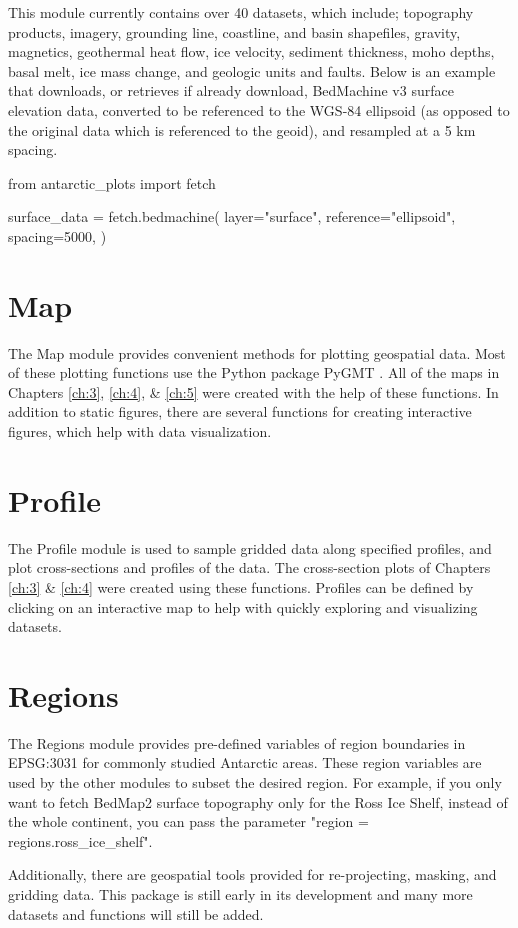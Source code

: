 This module currently contains over 40 datasets, which include; topography products, imagery, grounding line, coastline, and basin shapefiles, gravity, magnetics, geothermal heat flow, ice velocity, sediment thickness, moho depths, basal melt, ice mass change, and geologic units and faults. Below is an example that downloads, or retrieves if already download, BedMachine v3 surface elevation data, converted to be referenced to the WGS-84 ellipsoid (as opposed to the original data which is referenced to the geoid), and resampled at a 5 km spacing.
\begin{python}
from antarctic_plots import fetch

surface_data = fetch.bedmachine(
    layer="surface", 
    reference="ellipsoid", 
    spacing=5000,
)
\end{python}

\section{Map}

The Map module provides convenient methods for plotting geospatial data. Most of these plotting functions use the Python package PyGMT \citep{uiedapygmt2021}. All of the maps in Chapters \ref{ch:3}, \ref{ch:4}, \& \ref{ch:5} were created with the help of these functions. In addition to static figures, there are several functions for creating interactive figures, which help with data visualization. 

\section{Profile}

The Profile module is used to sample gridded data along specified profiles, and plot cross-sections and profiles of the data. The cross-section plots of Chapters \ref{ch:3} \& \ref{ch:4} were created using these functions. Profiles can be defined by clicking on an interactive map to help with quickly exploring and visualizing datasets. 

\section{Regions}

The Regions module provides pre-defined variables of region boundaries in EPSG:3031 for commonly studied Antarctic areas. These region variables are used by the other modules to subset the desired region. For example, if you only want to fetch BedMap2 surface topography only for the Ross Ice Shelf, instead of the whole continent, you can pass the parameter "region = regions.ross\_ice\_shelf".

Additionally, there are geospatial tools provided for re-projecting, masking, and gridding data. This package is still early in its development and many more datasets and functions will still be added. 